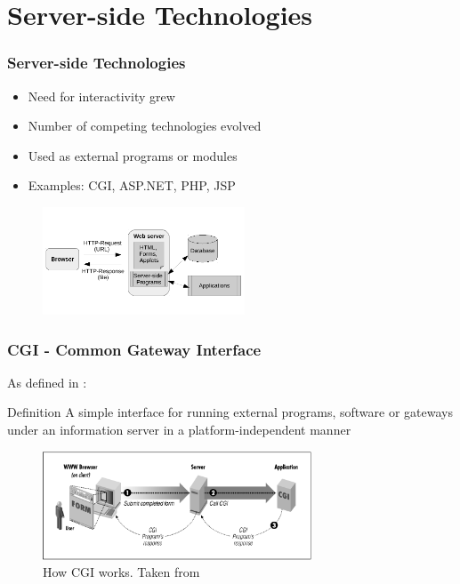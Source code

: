 \documentclass[9pt]{beamer}
\begin{document}
\section{Server-side Technologies}
\begin{frame}
\begin{multicols}{2}
\frametitle<presentation>{Server-side Technologies}
  \begin{itemize}
    \item Need for interactivity grew
    \item Number of competing technologies evolved
    \item Used as external programs or modules
    \item Examples: CGI, ASP.NET, PHP, JSP
  \end{itemize}
  
  \begin{figure}[h]
    \centerline{\includegraphics[width=6cm]{pics/webclient.pdf}}
  \end{figure}
\end{multicols}

\end{frame}

\begin{frame}
\frametitle<presentation>{CGI - Common Gateway Interface}
  As defined in \cite{cgiSpecs}:

  \begin{block}{Definition}
    A simple interface for running external programs, software or gateways under an information server in a platform-independent manner
  \end{block}

  \begin{figure}[h]
    \centerline{\includegraphics[width=8cm]{pics/cgi.png}}
    \caption{How CGI works. Taken from \cite{gundavaram1996cgi}}
    \label{fig-cgi}
  \end{figure}

\end{frame}
\end{document}
